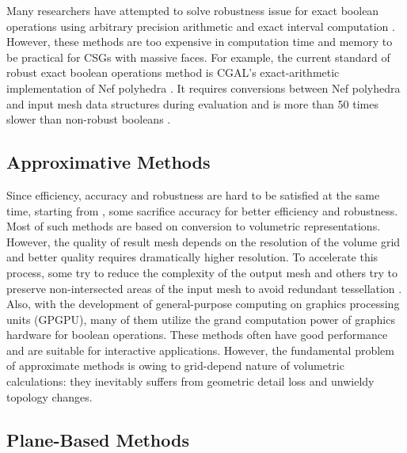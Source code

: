\documentclass[10pt,journal,compsoc]{IEEEtran}
\begin{document}
Many researchers have attempted to solve robustness issue for exact boolean operations using arbitrary precision arithmetic \cite{banerjee1996topologically, fortune1995polyhedral, keyser2004esolid, granados2003boolean, hachenberger2005boolean} and exact interval computation \cite{fang1993robustness, hu1996robust, segal1990using}. However, these methods are too expensive in computation time and memory to be practical for CSGs with massive faces. For example, the current standard of robust exact boolean operations method is CGAL's \cite{cgal:hk-bonp3-15a} exact-arithmetic implementation \cite{granados2003boolean} of Nef polyhedra \cite{bieri1988elementary}. It requires conversions between Nef polyhedra and input mesh data structures during evaluation and is more than 50 times slower than non-robust booleans \cite{bernstein2009fast}.


\subsection{Approximative Methods}

Since efficiency, accuracy and robustness are hard to be satisfied at the same time, starting from \cite{museth2002level}, some sacrifice accuracy for better efficiency and robustness. Most of such methods are based on conversion to volumetric representations. However, the quality of result mesh depends on the resolution of the volume grid and better quality requires dramatically higher resolution. To accelerate this process, some try to reduce the complexity of the output mesh \cite{varadhan2004topology} and others try to preserve non-intersected areas of the input mesh to avoid redundant tessellation \cite{pavic2010hybrid,wang2011approximate,zhao2011parallel,hable2005blister,ogayar2006gpu}. Also, with the development of general-purpose computing on graphics processing units (GPGPU), many of them utilize the grand computation power of graphics hardware for boolean operations. These methods often have good performance and are suitable for interactive applications. However, the fundamental problem of approximate methods is owing to grid-depend nature of volumetric calculations: they inevitably suffers from geometric detail loss and unwieldy topology changes.


\subsection{Plane-Based Methods}
\label{sec:pbrelated}
\end{document}
